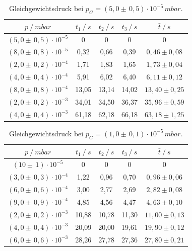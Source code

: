 \begin{table}[H]
\centering
\begin{tabular}{c|c|c|c|c}
	{$p \:/\: \si{mbar}$} & {$t_1 \:/\: \si{s} $} & {$t_2 \:/\: \si{s} $} & {$t_3 \:/\: \si{s} $} & {$\bar{t} \:/\: \si{s}$}\\
\midrule
$(5,0 \pm \, 0,5)\cdot 10^{-5}$ &0 &0 &0 &0\\
$(8,0 \pm \, 0,8)\cdot 10^{-5}$ &   0,32 &  0,66 &  0,39 & $0,46 \pm 0,08$\\
$(2,0 \pm \, 0,2)\cdot 10^{-4}$ &   1,71  &  1,83 &  1,65 & $1,73 \pm 0,04 $\\
$(4,0 \pm \, 0,4)\cdot 10^{-4}$ &   5,91 &  6,02 &  6,40 & $6,11 \pm 0,12 $\\
$(8,0 \pm \, 0,8)\cdot 10^{-4}$ &   13,05 &  13,14 &  14,02 & $13,40 \pm 0,25 $\\
$(2,0 \pm \, 0,2)\cdot 10^{-3}$ &   34,01 &  34,50 &  36,37 & $35,96 \pm 0,59 $\\
$(4,0 \pm \, 0,4)\cdot 10^{-3}$ &  61,18 & 62,18 & 66,18 & $63,18 \pm 1,25 $\\
\end{tabular}
\caption{Gleichgewichtsdruck bei $p_G=(5,0 \pm \, 0,5)\cdot 10^{-5} \, \si{mbar}$.}
\label{tab:leck_Turbo1}
\end{table}

\begin{table}[H]
\centering
\begin{tabular}{c|c|c|c|c}
	{$p \:/\: \si{mbar}$} & {$t_1 \:/\: \si{s} $} & {$t_2 \:/\: \si{s} $} & {$t_3 \:/\: \si{s} $} & {$\bar{t} \:/\: \si{s}$}\\
\midrule
$(10 \pm \, 1)\cdot 10^{-5}$ &0 &0 &0 &0\\
$(3,0 \pm \, 0,3)\cdot 10^{-4}$ &   1,22 &  0,96 &  0,70 & $0,96 \pm 0,06$\\
$(6,0 \pm \, 0,6)\cdot 10^{-4}$ &   3,00  &  2,77 &  2,69 & $2,82 \pm 0,08 $\\
$(9,0 \pm \, 0,9)\cdot 10^{-4}$ &   4,85 &  4,56 &  4,47 & $4,63 \pm 0,10 $\\
$(2,0 \pm \, 0,2)\cdot 10^{-3}$ &   10,88 &  10,78 &  11,30 & $11,00 \pm 0,13 $\\
$(4,0 \pm \, 0,4)\cdot 10^{-3}$ &   20,09 &  20,00 &  19,61 & $19,90 \pm 0,12 $\\
$(6,0 \pm \, 0,6)\cdot 10^{-3}$ &  28,26 & 27,78 & 27,36 & $27,80 \pm 0,21 $\\
\end{tabular}
\caption{Gleichgewichtsdruck bei $p_G=(1,0 \pm \, 0,1)\cdot 10^{-5} \, \si{mbar}$.}
\label{tab:leck_Turbo2}
\end{table}

